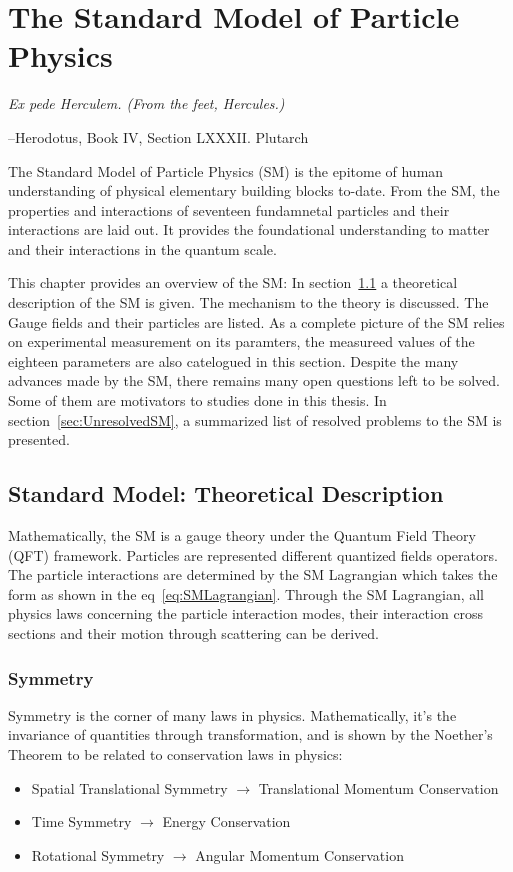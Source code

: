 \chapter{The Standard Model of Particle Physics}
\label{chapter:SM}


    
	
\epigraph{\textit{Ex pede Herculem. \newline(From the feet, Hercules.)}}{--Herodotus, Book IV, Section LXXXII. Plutarch}

The Standard Model of Particle Physics (SM) is the epitome of human understanding of physical elementary building blocks to-date. From the SM, the properties and interactions of seventeen fundamnetal particles and their interactions are laid out. It provides the foundational understanding to matter and their interactions in the quantum scale.

This chapter provides an overview of the SM: In section~\ref{sec:SM} a theoretical description of the SM is given. The mechanism to the theory is discussed. The Gauge fields and their particles are listed. As a complete picture of the SM relies on experimental measurement on its paramters, the measureed values of the eighteen parameters are also catelogued in this section. Despite the many advances made by the SM, there remains many open
questions left to be solved. Some of them are motivators to studies done in this thesis. In section~\ref{sec:UnresolvedSM}, a summarized list of resolved problems to the SM is presented.

\section{Standard Model: Theoretical Description}
\label{sec:SM}

Mathematically, the SM is a gauge theory under the 
Quantum Field Theory (QFT) framework. Particles are represented different quantized fields operators. The particle interactions are determined by the SM Lagrangian which takes the form as shown in the eq~\ref{eq:SMLagrangian}. Through the SM Lagrangian, all physics laws concerning the particle interaction modes, their interaction cross sections and their motion through scattering can be derived.

\subsection{Symmetry}
Symmetry is the corner of many laws in physics. Mathematically, it's the invariance of quantities through transformation, and is shown by the Noether's Theorem to be related to conservation laws in physics:
    \begin{itemize}
        \item Spatial Translational Symmetry $\rightarrow$ Translational Momentum Conservation
        \item Time Symmetry $\rightarrow$ Energy Conservation
        \item Rotational Symmetry $\rightarrow$ Angular Momentum Conservation
    \end{itemize}

